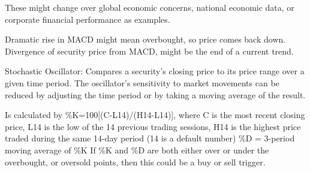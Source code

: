 \documentclass{article}
\begin{document}
These might change over global economic concerns, national economic data, or corporate financial performance as examples.


Dramatic rise in MACD might mean overbought, so price comes back down.
Divergence of security price from MACD, might be the end of a current trend.


Stochastic Oscillator:  Compares a security’s closing price to its price range over a given time period.  The oscillator’s sensitivity to market movements can be reduced by adjusting the time period or by taking a moving average of the result.


Is calculated by \%K=100[(C-L14)/(H14-L14)], where C is the most recent closing price, L14 is the low of the 14 previous trading sessions, H14 is the highest price traded during the same 14-day period (14 is a default number)
\%D = 3-period moving average of \%K
If \%K and \%D are both either over or under the overbought, or oversold points, then this could be a buy or sell trigger.
\end{document}
